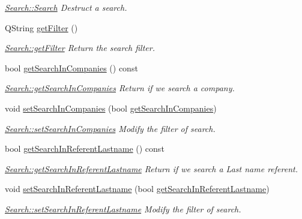 \begin{DoxyCompactItemize}
\begin{DoxyCompactList}\small\item\em \hyperlink{classModels_1_1Search_a05ea0037161dce5dde6876afa384d71f}{Search\+::\+Search} Destruct a search. \end{DoxyCompactList}\item 
Q\+String \hyperlink{classModels_1_1Search_ab3ec88b48f6b404f8027dcbfce1495c6}{get\+Filter} ()
\begin{DoxyCompactList}\small\item\em \hyperlink{classModels_1_1Search_ab3ec88b48f6b404f8027dcbfce1495c6}{Search\+::get\+Filter} Return the search filter. \end{DoxyCompactList}\item 
bool \hyperlink{classModels_1_1Search_ad38428f4aa81ba5951f82e0fcb92779c}{get\+Search\+In\+Companies} () const 
\begin{DoxyCompactList}\small\item\em \hyperlink{classModels_1_1Search_ad38428f4aa81ba5951f82e0fcb92779c}{Search\+::get\+Search\+In\+Companies} Return if we search a company. \end{DoxyCompactList}\item 
void \hyperlink{classModels_1_1Search_ac32bf6038d77b99a097faee3efa04cc7}{set\+Search\+In\+Companies} (bool \hyperlink{classModels_1_1Search_ad38428f4aa81ba5951f82e0fcb92779c}{get\+Search\+In\+Companies})
\begin{DoxyCompactList}\small\item\em \hyperlink{classModels_1_1Search_ac32bf6038d77b99a097faee3efa04cc7}{Search\+::set\+Search\+In\+Companies} Modify the filter of search. \end{DoxyCompactList}\item 
bool \hyperlink{classModels_1_1Search_aa415bcd966fef7bcd1cd5bd3373d57f6}{get\+Search\+In\+Referent\+Lastname} () const 
\begin{DoxyCompactList}\small\item\em \hyperlink{classModels_1_1Search_aa415bcd966fef7bcd1cd5bd3373d57f6}{Search\+::get\+Search\+In\+Referent\+Lastname} Return if we search a Last name referent. \end{DoxyCompactList}\item 
void \hyperlink{classModels_1_1Search_adf5e7ebfc61b309db1b110de5167b6d5}{set\+Search\+In\+Referent\+Lastname} (bool \hyperlink{classModels_1_1Search_aa415bcd966fef7bcd1cd5bd3373d57f6}{get\+Search\+In\+Referent\+Lastname})
\begin{DoxyCompactList}\small\item\em \hyperlink{classModels_1_1Search_adf5e7ebfc61b309db1b110de5167b6d5}{Search\+::set\+Search\+In\+Referent\+Lastname} Modify the filter of search. \end{DoxyCompactList}\item 

\end{DoxyCompactItemize}
